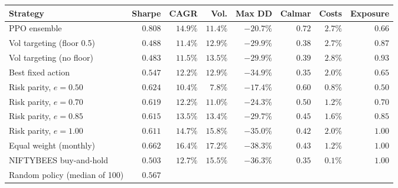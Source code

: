 \begin{tabular}{lrrrrrrr}
\toprule
Strategy & Sharpe & CAGR & Vol. & Max DD & Calmar & Costs & Exposure \\
\midrule
PPO ensemble & $0.808$ & $14.9\%$ & $11.4\%$ & $-20.7\%$ & $0.72$ & $2.7\%$ & $0.66$ \\
Vol targeting (floor 0.5) & $0.488$ & $11.4\%$ & $12.9\%$ & $-29.9\%$ & $0.38$ & $2.7\%$ & $0.87$ \\
Vol targeting (no floor) & $0.483$ & $11.5\%$ & $13.5\%$ & $-29.9\%$ & $0.39$ & $2.8\%$ & $0.93$ \\
Best fixed action & $0.547$ & $12.2\%$ & $12.9\%$ & $-34.9\%$ & $0.35$ & $2.0\%$ & $0.65$ \\
Risk parity, $e=0.50$ & $0.624$ & $10.4\%$ & $7.8\%$ & $-17.4\%$ & $0.60$ & $0.8\%$ & $0.50$ \\
Risk parity, $e=0.70$ & $0.619$ & $12.2\%$ & $11.0\%$ & $-24.3\%$ & $0.50$ & $1.2\%$ & $0.70$ \\
Risk parity, $e=0.85$ & $0.615$ & $13.5\%$ & $13.4\%$ & $-29.7\%$ & $0.45$ & $1.6\%$ & $0.85$ \\
Risk parity, $e=1.00$ & $0.611$ & $14.7\%$ & $15.8\%$ & $-35.0\%$ & $0.42$ & $2.0\%$ & $1.00$ \\
Equal weight (monthly) & $0.662$ & $16.4\%$ & $17.2\%$ & $-38.3\%$ & $0.43$ & $1.2\%$ & $1.00$ \\
NIFTYBEES buy-and-hold & $0.503$ & $12.7\%$ & $15.5\%$ & $-36.3\%$ & $0.35$ & $0.1\%$ & $1.00$ \\
Random policy (median of 100) & $0.567$ &  &  &  &  &  &  \\
\bottomrule
\end{tabular}
